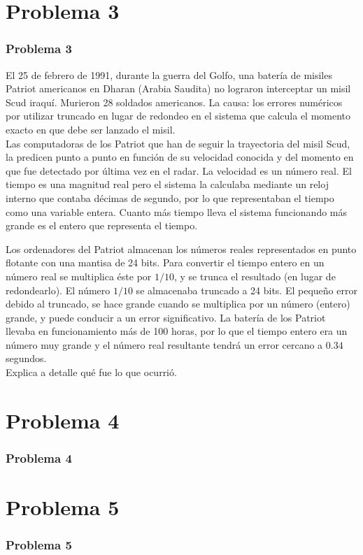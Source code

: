 \section{Problema 3}
\begin{frame}
\frametitle{Problema 3}
El 25 de febrero de 1991, durante la guerra del Golfo, una bater\'{i}a de misiles Patriot americanos en Dharan (Arabia Saudita) no lograron interceptar un misil Scud iraqu\'{i}. Murieron 28 soldados americanos. La causa: los errores num\'{e}ricos por utilizar truncado en lugar de redondeo en el sistema que calcula el momento exacto en que debe ser lanzado el misil.
\\
\medskip
Las computadoras de los Patriot que han de seguir la trayectoria del misil Scud, la predicen punto a punto en funci\'{o}n de su velocidad conocida y del momento en que fue detectado por última vez en el radar. La velocidad es un número real. El tiempo es una magnitud real pero el sistema la calculaba mediante un reloj interno que contaba d\'{e}cimas de segundo, por lo que representaban el tiempo como una variable entera. Cuanto m\'{a}s tiempo lleva el sistema funcionando m\'{a}s grande es el entero que representa el tiempo.
\end{frame}
\begin{frame}
Los ordenadores del Patriot almacenan los números reales representados en punto flotante con una mantisa de 24 bits. Para convertir el tiempo entero en un número real se multiplica \'{e}ste por $1/10$, y se trunca el resultado (en lugar de redondearlo). El número $1/10$ se almacenaba truncado a 24 bits. El pequeño error debido al truncado, se hace grande cuando se multiplica por un número (entero) grande, y puede conducir a un error significativo. La bater\'{i}a de los Patriot llevaba en funcionamiento m\'{a}s de 100 horas, por lo que el tiempo entero era un número muy grande y el número real resultante tendr\'{a} un error cercano a $0.34$ segundos.
\\
\medskip
Explica a detalle qu\'{e} fue lo que ocurri\'{o}.
\end{frame}
\section{Problema 4}
\begin{frame}
\frametitle{Problema 4}
\end{frame}
\section{Problema 5}
\begin{frame}
\frametitle{Problema 5}
\end{frame}
